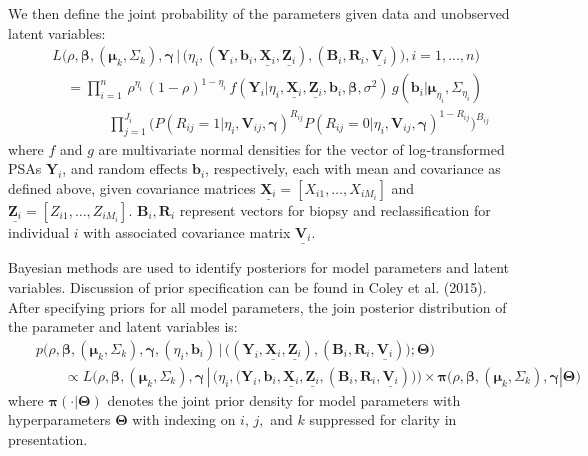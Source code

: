 \documentclass[letterpaper]{article}
\newcommand{\bmbeta}{\boldsymbol{\beta}}
\newcommand{\bmpi}{\boldsymbol{\pi}}
\newcommand{\bmmu}{\boldsymbol{\mu}}
\newcommand{\bmgamma}{\boldsymbol{\gamma}}
\newcommand{\bmY}{\mathbf{Y}}
\newcommand{\bmZ}{\mathbf{Z}}
\newcommand{\bmX}{\mathbf{X}}
\newcommand{\bmV}{\mathbf{V}}
\newcommand{\bmb}{\mathbf{b}}
\newcommand{\bmTheta}{\boldsymbol{\Theta}}
\newcommand{\mydots}{...}
\begin{document}
We then define the joint probability of the parameters given data and unobserved latent variables: 
\begin{eqnarray}
&&L\Big(\rho, \bmbeta, (\bmmu_k, \Sigma_k), \bmgamma\, | \,\big( \eta_i, (\bmY_i, \bmb_i, \underline{\bmX_i}, \underline{\bmZ_i}), (\mathbf{B}_{i}, \mathbf{R}_{i}, \underline{\bmV_{i}}) \big), i=1,\mydots,n \Big) \nonumber \\
&& \quad =  \prod_{i=1}^{n}  \,  \rho^{\eta_i}\,(1-\rho)^{1-\eta_i}\, f(\bmY_i | \eta_i, \underline{\bmX_i}, \underline{\bmZ_i}, \bmb_i, \bmbeta, \sigma^2) \, g(\bmb_i |  \bmmu_{\eta_i}, \Sigma_{\eta_i})  \nonumber \\
\label{eq:lik-inf}
&& \qquad \qquad \prod_{j=1}^{J_i}  \big(P(R_{ij}=1 | \eta_i, \bmV_{ij}, \bmgamma) ^{R_{ij}} P(R_{ij}=0 | \eta_i, \bmV_{ij}, \bmgamma)^{1-R_{ij}} \big)^{B_{ij}} 
\end{eqnarray}
where $f$ and $g$ are multivariate normal densities for the vector of log-transformed PSAs $\bmY_i$, and random effects $\bmb_i$, respectively, each with mean and covariance as defined above, given covariance matrices $\underline{\bmX_i} = [X_{i1},\dots, X_{iM_i}]$ and $\underline{\bmZ_i} = [Z_{i1},\dots, Z_{iM_i}]$. $\mathbf{B}_{i}, \mathbf{R}_{i}$ represent vectors for biopsy and reclassification for individual $i$ with associated covariance matrix $\underline{\bmV_{i}}$.

Bayesian methods are used to identify posteriors for model parameters and latent variables. Discussion of prior specification can be found in Coley et al. (2015). After specifying priors for all model parameters, the join posterior distribution of the parameter and latent variables is:
\begin{eqnarray}
&& p\Big(\rho, \bmbeta, (\bmmu_k,\Sigma_k), \bmgamma, (\eta_i,\bmb_i) \,| \, \big( (\bmY_i, \underline{\bmX_i}, \underline{\bmZ_i}), (\mathbf{B}_{i}, \mathbf{R}_{i}, \underline{\bmV_{i}}) \big); \bmTheta\Big) \nonumber\\
\label{eq:post-inf}
&&\qquad  \propto L\Big(\rho,  \bmbeta, (\bmmu_k, \Sigma_k), \bmgamma \, | \,\big(\eta_i, (\bmY_i, \bmb_i, \underline{\bmX_i}, \underline{\bmZ_i},(\mathbf{B}_{i}, \mathbf{R}_{i}, \underline{\bmV_{i}})\big) \Big) \times \bmpi\big(\rho,\bmbeta, (\bmmu_k, \Sigma_k),\bmgamma |\bmTheta\big)
\end{eqnarray}
where $\bmpi(\cdot|\bmTheta)$ denotes the joint prior density for model parameters with hyperparameters $\bmTheta$ with indexing on $i,\,j,$ and $k$ suppressed for clarity in presentation.
\end{document}
